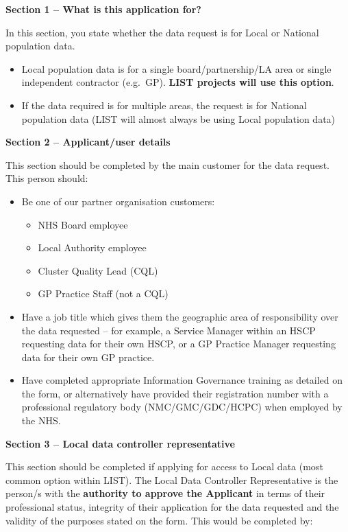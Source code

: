 \documentclass[
]{book}
\begin{document}
\textbf{Section 1 -- What is this application for?}

In this section, you state whether the data request is for Local or National population data.

\begin{itemize}
\item
  Local population data is for a single board/partnership/LA area or single independent contractor (e.g.~GP). \textbf{LIST projects will use this option}.
\item
  If the data required is for multiple areas, the request is for National population data (LIST will almost always be using Local population data)
\end{itemize}

\textbf{Section 2 -- Applicant/user details}

This section should be completed by the main customer for the data request. This person should:

\begin{itemize}
\item
  Be one of our partner organisation customers:

  \begin{itemize}
  \item
    NHS Board employee
  \item
    Local Authority employee
  \item
    Cluster Quality Lead (CQL)
  \item
    GP Practice Staff (not a CQL)
  \end{itemize}
\item
  Have a job title which gives them the geographic area of responsibility over the data requested -- for example, a Service Manager within an HSCP requesting data for their own HSCP, or a GP Practice Manager requesting data for their own GP practice.
\item
  Have completed appropriate Information Governance training as detailed on the form, or alternatively have provided their registration number with a professional regulatory body (NMC/GMC/GDC/HCPC) when employed by the NHS.
\end{itemize}

\textbf{Section 3 -- Local data controller representative}

This section should be completed if applying for access to Local data (most common option within LIST). The Local Data Controller Representative is the person/s with the \textbf{authority to approve the Applicant} in terms of their professional status, integrity of their application for the data requested and the validity of the purposes stated on the form. This would be completed by:
\end{document}

